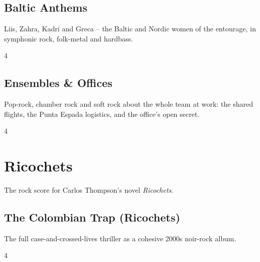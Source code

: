\documentclass[a4paper,landscape]{memoir}
\begin{document}
\chapter{Baltic Anthems}
Liis, Zahra, Kadri and Greca -- the Baltic and Nordic women of the entourage, in symphonic rock, folk-metal and hardbass.
\clearpage\begin{multicols*}{4}
\end{multicols*}

\chapter{Ensembles \& Offices}
Pop-rock, chamber rock and soft rock about the whole team at work: the shared flights, the Punta Espada logistics, and the office’s open secret.
\clearpage\begin{multicols*}{4}
\end{multicols*}

\part{Ricochets}
The rock score for Carlos Thompson’s novel \emph{Ricochets}.

\chapter{The Colombian Trap (Ricochets)}
The full case-and-crossed-lives thriller as a cohesive 2000s noir-rock album.
\clearpage\begin{multicols*}{4}
\end{multicols*}
\end{document}
